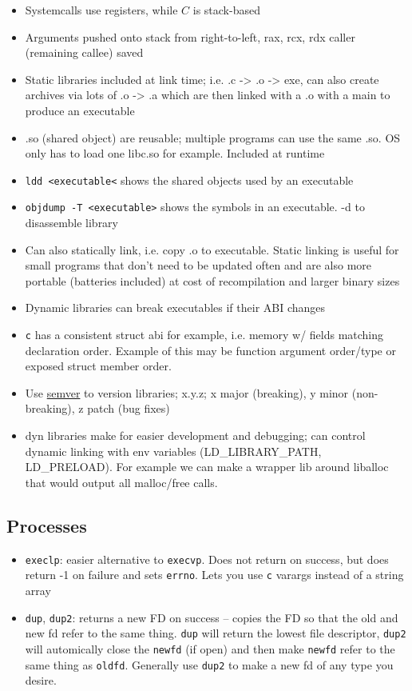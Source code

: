 \documentclass[../notes.tex]{subfiles}
\begin{document}
\begin{itemize}
    \item Systemcalls use registers, while $ C $ is stack-based
    \item Arguments pushed onto stack from right-to-left, rax, rcx, rdx caller (remaining callee) saved
    \item Static libraries included at link time; i.e. .c -> .o -> exe, can also create archives via lots of .o -> .a which are then linked with a .o with a main to produce an executable
    \item .so (shared object) are reusable; multiple programs can use the same .so. OS only has to load one libc.so for example. Included at runtime
    \item \texttt{ldd <executable<} shows the shared objects used by an executable
    \item \texttt{objdump -T <executable>} shows the symbols in an executable. -d to disassemble library
    \item Can also statically link, i.e. copy .o to executable. Static linking is useful for small programs that don't need to be updated often and are also more portable (batteries included) at cost of recompilation and larger binary sizes
    \item Dynamic libraries can break executables if their ABI changes
    \item \texttt{c} has a consistent struct abi for example, i.e. memory w/ fields matching declaration order. Example of this may be function argument order/type or exposed struct member order.
    \item Use \href{https://semver.org}{semver} to version libraries; x.y.z; x major (breaking), y minor (non-breaking), z patch (bug fixes)
    \item dyn libraries make for easier development and debugging; can control dynamic linking with env variables (LD\_LIBRARY\_PATH, LD\_PRELOAD). For example we can make a wrapper lib around liballoc that would output all malloc/free calls.
\end{itemize}

\subsection{Processes}


\begin{itemize}
    \item \texttt{execlp}: easier alternative to \texttt{execvp}. Does not return on success, but does return -1 on failure and sets \texttt{errno}. Lets you use \texttt{c} varargs instead of a string array
    \item \texttt{dup}, \texttt{dup2}: returns a new FD on success -- copies the FD so that the old and new fd refer to the same thing. \texttt{dup} will return the lowest file descriptor, \texttt{dup2} will automically close the \texttt{newfd} (if open) and then make \texttt{newfd} refer to the same thing as \texttt{oldfd}. Generally use \texttt{dup2} to make a new fd of any type you desire.
\end{itemize}
\end{document}
